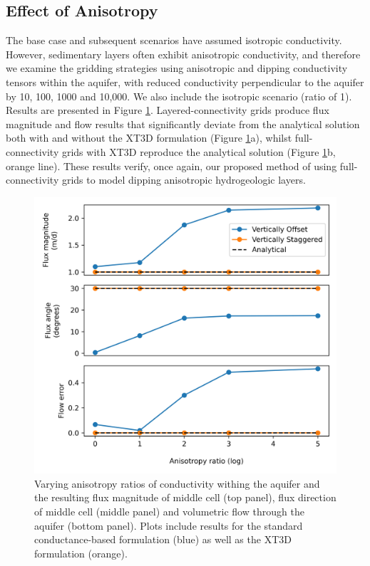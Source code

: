 \documentclass{article}
\begin{document}
\subsection{Effect of Anisotropy}

The base case and subsequent scenarios have assumed isotropic conductivity. However, sedimentary layers often exhibit anisotropic conductivity, and therefore we examine the gridding strategies using anisotropic and dipping conductivity tensors within the aquifer, with reduced conductivity perpendicular to the aquifer by 10, 100, 1000 and 10,000. We also include the isotropic scenario (ratio of 1). Results are presented in Figure \ref{fig:fig5}. Layered-connectivity grids produce flux magnitude and flow results that significantly deviate from the analytical solution both with and without the XT3D formulation (Figure \ref{fig:fig5}a), whilst full-connectivity grids with XT3D reproduce the analytical solution (Figure \ref{fig:fig5}b, orange line). These results verify, once again, our proposed method of using full-connectivity grids to model dipping anisotropic hydrogeologic layers.


\begin{figure}
	\begin{center}
	\includegraphics[scale=0.9]{../figures/fig5paper.png}
	\caption{Varying anisotropy ratios of conductivity withing the aquifer and the resulting flux magnitude of middle cell (top panel), flux direction of middle cell (middle panel) and volumetric flow through the aquifer (bottom panel). Plots include results for the standard conductance-based formulation (blue) as well as the XT3D formulation (orange).}
	\label{fig:fig5}
	\end{center}
\end{figure}
\end{document}
